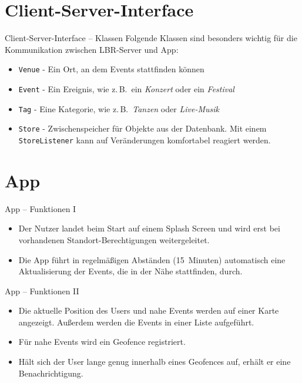 \documentclass{beamer}
\begin{document}
	\section{Client-Server-Interface}
	\begin{frame}{Client-Server-Interface -- Klassen}
		Folgende Klassen sind besonders wichtig für die Kommunikation zwischen LBR-Server und App:
		\begin{itemize}
			\item \texttt{Venue} - Ein Ort, an dem Events stattfinden können
			\item \texttt{Event} - Ein Ereignis, wie z.\,B.\ ein \textit{Konzert} oder ein \textit{Festival}
			\item \texttt{Tag} - Eine Kategorie, wie z.\,B.\ \textit{Tanzen} oder \textit{Live-Musik}
			\item \texttt{Store} - Zwischenspeicher für Objekte aus der Datenbank. Mit einem \texttt{StoreListener} kann auf Veränderungen komfortabel reagiert werden.
		\end{itemize}
	\end{frame}
	
	
	\section{App}
	\begin{frame}{App -- Funktionen I}
		\begin{itemize}
			\item Der Nutzer landet beim Start auf einem \alert{Splash Screen} und wird erst bei vorhandenen Standort-Berechtigungen weitergeleitet.
			\item Die App führt in regelmäßigen Abständen (15~Minuten) automatisch eine \alert{Aktualisierung} der Events, die in der Nähe stattfinden, durch. 
		\end{itemize}
	\end{frame}

	\begin{frame}{App -- Funktionen II}
		\begin{itemize}
			\item Die aktuelle Position des Users und nahe Events werden auf einer \alert{Karte} angezeigt. Außerdem werden die Events in einer Liste aufgeführt.
			\item Für nahe Events wird ein \alert{Geofence} registriert.
			\item Hält sich der User lange genug innerhalb eines Geofences auf, erhält er eine \alert{Benachrichtigung}.
		\end{itemize}
	\end{frame}
\end{document}

